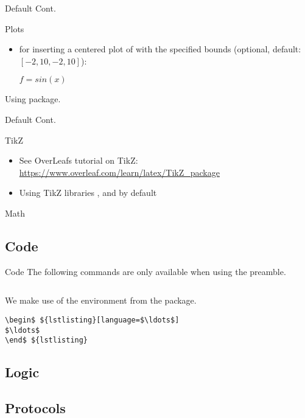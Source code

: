 \begin{frame}{Default Cont.}
  \begin{block}{Plots}
    \begin{itemize}
      \item {} for inserting a centered plot of  with the specified bounds (optional, default: $[-2, 10, -2, 10]$): 
      
      $f = sin(x)$
      
      
    \end{itemize}
    Using  package.
  \end{block}
\end{frame}

\begin{frame}{Default Cont.}
  \begin{block}{TikZ}
    \begin{itemize}
      \item See OverLeafs tutorial on TikZ: \url{https://www.overleaf.com/learn/latex/TikZ_package}
      \item Using TikZ libraries ,  and  by default
    \end{itemize}
  \end{block}
  \begin{block}{Math}
  \end{block}
\end{frame}

\subsection{Code}
\begin{frame}[fragile]{Code}
  The following commands are only available when using the  preamble.
  \begin{lstlisting}[language=MyTeX]
 \end{lstlisting}
  We make use of the  environment from the  package.
  \begin{lstlisting}[language=MyTeX]
\begin$ ${lstlisting}[language=$\ldots$] 
$\ldots$
\end$ ${lstlisting} \end{lstlisting}
\end{frame}
\subsection{Logic}
\subsection{Protocols}

\fi
